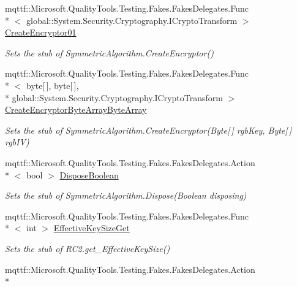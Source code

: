\begin{DoxyCompactItemize}
mqttf\-::\-Microsoft.\-Quality\-Tools.\-Testing.\-Fakes.\-Fakes\-Delegates.\-Func\\*
$<$ global\-::\-System.\-Security.\-Cryptography.\-I\-Crypto\-Transform $>$ \hyperlink{class_system_1_1_security_1_1_cryptography_1_1_fakes_1_1_stub_r_c2_a3d35c4c46a795c6be0c95feae3644aca}{Create\-Encryptor01}
\begin{DoxyCompactList}\small\item\em Sets the stub of Symmetric\-Algorithm.\-Create\-Encryptor()\end{DoxyCompactList}\item 
mqttf\-::\-Microsoft.\-Quality\-Tools.\-Testing.\-Fakes.\-Fakes\-Delegates.\-Func\\*
$<$ byte\mbox{[}$\,$\mbox{]}, byte\mbox{[}$\,$\mbox{]}, \\*
global\-::\-System.\-Security.\-Cryptography.\-I\-Crypto\-Transform $>$ \hyperlink{class_system_1_1_security_1_1_cryptography_1_1_fakes_1_1_stub_r_c2_a29bed6090951f2d4d3eb8018edcb8729}{Create\-Encryptor\-Byte\-Array\-Byte\-Array}
\begin{DoxyCompactList}\small\item\em Sets the stub of Symmetric\-Algorithm.\-Create\-Encryptor(\-Byte\mbox{[}$\,$\mbox{]} rgb\-Key, Byte\mbox{[}$\,$\mbox{]} rgb\-I\-V)\end{DoxyCompactList}\item 
mqttf\-::\-Microsoft.\-Quality\-Tools.\-Testing.\-Fakes.\-Fakes\-Delegates.\-Action\\*
$<$ bool $>$ \hyperlink{class_system_1_1_security_1_1_cryptography_1_1_fakes_1_1_stub_r_c2_a9c6052b035e0e0a67e01782af0494034}{Dispose\-Boolean}
\begin{DoxyCompactList}\small\item\em Sets the stub of Symmetric\-Algorithm.\-Dispose(\-Boolean disposing)\end{DoxyCompactList}\item 
mqttf\-::\-Microsoft.\-Quality\-Tools.\-Testing.\-Fakes.\-Fakes\-Delegates.\-Func\\*
$<$ int $>$ \hyperlink{class_system_1_1_security_1_1_cryptography_1_1_fakes_1_1_stub_r_c2_a957e7cacb37805e5b756501e93a35b74}{Effective\-Key\-Size\-Get}
\begin{DoxyCompactList}\small\item\em Sets the stub of R\-C2.\-get\-\_\-\-Effective\-Key\-Size()\end{DoxyCompactList}\item 
mqttf\-::\-Microsoft.\-Quality\-Tools.\-Testing.\-Fakes.\-Fakes\-Delegates.\-Action\\*

\end{DoxyCompactItemize}
